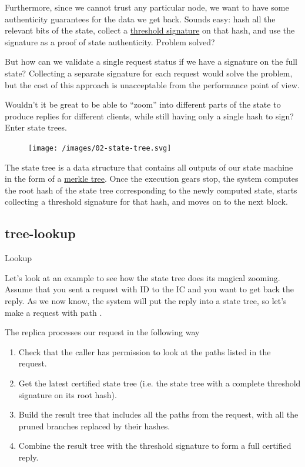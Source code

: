\documentclass{article}
\begin{document}
Furthermore, since we cannot trust any particular node, we want to have some authenticity guarantees for the data we get back.
Sounds easy: hash all the relevant bits of the state, collect a \href{https://en.wikipedia.org/wiki/Threshold_cryptosystem}{threshold signature} on that hash, and use the signature as a proof of state authenticity.
Problem solved?

But how can we validate a single request status if we have a signature on the full state?
Collecting a separate signature for each request would solve the problem, but the cost of this approach is unacceptable from the performance point of view.

Wouldn't it be great to be able to ``zoom'' into different parts of the state to produce replies for different clients, while still having only a single hash to sign?
Enter state trees.

\begin{figure}[grayscale-diagram]
\texttt{[image: /images/02-state-tree.svg]}
\end{figure}

The state tree is a data structure that contains all outputs of our state machine in the form of a \href{https://en.wikipedia.org/wiki/Merkle_tree}{merkle tree}.
Once the execution gears stop, the system computes the root hash of the state tree corresponding to the newly computed state, starts collecting a threshold signature for that hash, and moves on to the next block.

\subsection{tree-lookup}{Lookup}

Let's look at an example to see how the state tree does its magical zooming.
Assume that you sent a request with ID  to the IC and you want to get back the reply.
As we now know, the system will put the reply into a state tree, so let's make a \href{https://smartcontracts.org/docs/interface-spec/index.html#http-read-state}{} request with path .

The replica processes our request in the following way
\begin{enumerate}
  \item Check that the caller has permission to look at the paths listed in the  request.
  \item Get the latest certified state tree (i.e. the state tree with a complete threshold signature on its root hash).
  \item Build the result tree that includes all the paths from the  request, with all the pruned branches replaced by their hashes.
  \item Combine the result tree with the threshold signature to form a full certified reply.
\end{enumerate}
\end{document}
